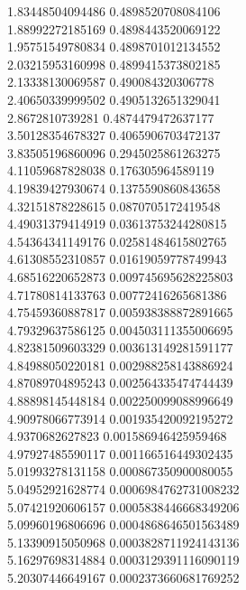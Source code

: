 {1.83448504094486 0.4898520708084106 \\
1.88992272185169 0.4898443520069122 \\
1.95751549780834 0.4898701012134552 \\
2.03215953160998 0.4899415373802185 \\
2.13338130069587 0.490084320306778 \\
2.40650339999502 0.4905132651329041 \\
2.8672810739281 0.4874479472637177 \\
3.50128354678327 0.4065906703472137 \\
3.83505196860096 0.2945025861263275 \\
4.11059687828038 0.176305964589119 \\
4.19839427930674 0.1375590860843658 \\
4.32151878228615 0.0870705172419548 \\
4.49031379414919 0.03613753244280815 \\
4.54364341149176 0.02581484615802765 \\
4.61308552310857 0.01619059778749943 \\
4.68516220652873 0.009745695628225803 \\
4.71780814133763 0.00772416265681386 \\
4.75459360887817 0.005938388872891665 \\
4.79329637586125 0.004503111355006695 \\
4.82381509603329 0.003613149281591177 \\
4.84988050220181 0.002988258143886924 \\
4.87089704895243 0.002564335474744439 \\
4.88898145448184 0.002250099088996649 \\
4.90978066773914 0.001935420092195272 \\
4.9370682627823 0.001586946425959468 \\
4.97927485590117 0.001166516449302435 \\
5.01993278131158 0.000867350900080055 \\
5.04952921628774 0.0006984762731008232 \\
5.07421920606157 0.0005838446668349206 \\
5.09960196806696 0.0004868646501563489 \\
5.13390915050968 0.0003828711924143136 \\
5.16297698314884 0.0003129391116090119 \\
5.20307446649167 0.0002373660681769252 \\
}
